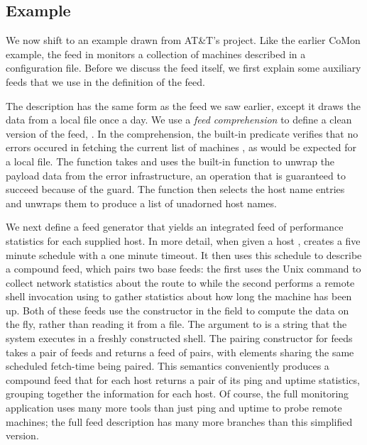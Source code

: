 \subsection{\vizGems{} Example}
We now shift to an example drawn from AT\&T's \vizGems{} project.  Like
the earlier CoMon example, the  feed in 
monitors a collection of machines described in a configuration file.
Before we discuss the  feed itself, we first explain some
auxiliary feeds that we use in the definition of the  feed.   

The  description has the same form as the 
feed we saw earlier, except it draws the data from a local file once a
day.  We use a \textit{feed comprehension} to define a clean
version of the feed, .  In the comprehension, the
built-in predicate  verifies that no errors occured in
fetching the current list of machines , as would be expected
for a local file.  The function  takes  and uses
the built-in function  to unwrap the payload data from
the error infrastructure, an operation that is guaranteed to succeed
because of the  guard. The function  then
selects the host name entries and unwraps them to produce a list of
unadorned host names.   

We next define a feed generator  that yields an
integrated feed of performance statistics for each supplied host.  In
more detail, when given a host ,  creates a five
minute schedule with a one minute timeout. It then uses this schedule
to describe a compound feed, which pairs two base feeds: the first
uses the Unix command  to collect network statistics about
the route to  while the second performs a remote shell
invocation using  to gather statistics about how long the
machine has been up.  Both of these feeds use the 
constructor in the  field to compute the data on the fly,
rather than reading it from a file.  The argument to  is a
string that the system executes in a freshly constructed shell.  The
pairing constructor for feeds takes a pair of feeds and returns a feed
of pairs, with elements sharing the same scheduled fetch-time being
paired. This semantics conveniently produces a compound feed that for
each host returns a pair of its ping and uptime statistics, grouping
together the information for each host.  Of course, the full
\vizGems{} monitoring application uses many more tools than just ping
and uptime to probe remote machines; the full feed description has
many more branches than this simplified version. 


